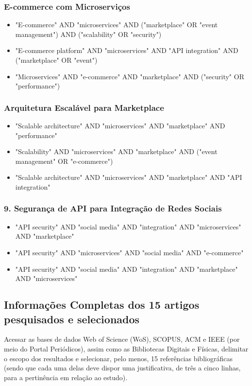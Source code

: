 \documentclass[a4paper,12pt]{article}
\begin{document}
\subsubsection{E-commerce com Microserviços}
\begin{itemize}
    \item "E-commerce" AND "microservices" AND ("marketplace" OR "event management") AND ("scalability" OR "security")
    \item "E-commerce platform" AND "microservices" AND "API integration" AND ("marketplace" OR "event")
    \item "Microservices" AND "e-commerce" AND "marketplace" AND ("security" OR "performance")
\end{itemize}

\subsubsection{Arquitetura Escalável para Marketplace}
\begin{itemize}
    \item "Scalable architecture" AND "microservices" AND "marketplace" AND "performance"
    \item "Scalability" AND "microservices" AND "marketplace" AND ("event management" OR "e-commerce")
    \item "Scalable architecture" AND "microservices" AND "marketplace" AND "API integration"
\end{itemize}

\subsubsection{9. Segurança de API para Integração de Redes Sociais}
\begin{itemize}
    \item "API security" AND "social media" AND "integration" AND "microservices" AND "marketplace"
    \item "API security" AND "microservices" AND "social media" AND "e-commerce"
    \item "API security" AND "social media" AND "integration" AND "marketplace" AND "microservices"
\end{itemize}

\subsection{Informações Completas dos 15 artigos pesquisados e selecionados}
Acessar as bases de dados Web of Science (WoS), SCOPUS, ACM e IEEE (por meio do Portal Periódicos), assim como as Bibliotecas Digitais e Físicas, delimitar o escopo dos resultados e selecionar, pelo menos, 15 referências bibliográficas (sendo que cada uma delas deve dispor uma justificativa, de três a cinco linhas, para a pertinência em relação ao estudo).
\end{document}
